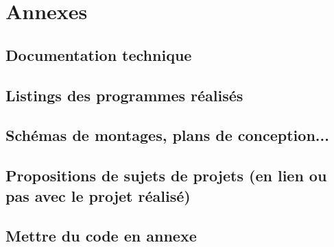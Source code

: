 \documentclass[a4paper, 12pt]{report} %
\begin{document}

\newpage
\chapter*{Annexes}
\renewcommand{\thesection}{\Alph{section}}  %
\setcounter{section}{0} %

\section{Documentation technique}
\newpage

\section{Listings des programmes réalisés}
\newpage

\section{Schémas de montages, plans de conception...}
\newpage

\section{Propositions de sujets de projets (en lien ou pas avec le projet réalisé)}
\newpage

\section{Mettre du code en annexe}
\end{document}
